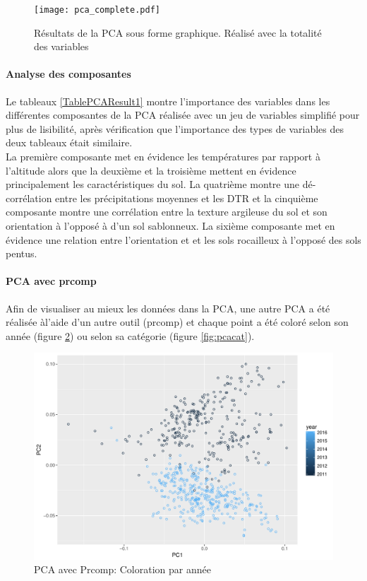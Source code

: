 \begin{figure}[H]
	\texttt{[image: pca\_complete.pdf]}
	\caption{\label{FigurePCAResult1} Résultats de la PCA sous forme graphique. Réalisé avec la totalité des variables }
\end{figure}


\paragraph{Analyse des composantes} Le tableaux \ref{TablePCAResult1} montre l'importance des variables dans les différentes composantes de la PCA réalisée avec un  jeu de variables simplifié pour plus de lisibilité, après vérification que l'importance des types de variables des deux tableaux était similaire. \\

\noindent La première composante met en évidence les températures par rapport à l'altitude alors que la deuxième et la troisième mettent en évidence principalement les caractéristiques du sol. La quatrième montre une dé-corrélation entre les précipitations moyennes et les DTR et la cinquième composante montre une corrélation entre la texture argileuse du sol et son orientation à l'opposé à d'un sol sablonneux. La sixième composante met en évidence une relation entre l'orientation et et les sols rocailleux à l'opposé des sols pentus. 


\paragraph{PCA avec prcomp} Afin de visualiser au mieux les données dans la PCA, une autre PCA a été réalisée àl'aide d'un autre outil (prcomp) et chaque point a été coloré selon son année (figure \ref{fig:pcayear}) ou selon sa catégorie (figure \ref{fig:pcacat}). 


\begin{figure}[H]
	\centering
	\includegraphics[width=0.7\linewidth]{img/PCA/PCAYear}
	\caption{PCA avec Prcomp: Coloration par année}
	\label{fig:pcayear}
\end{figure}


